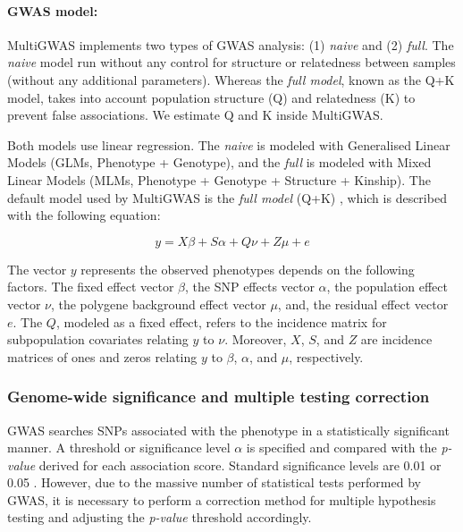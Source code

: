 \paragraph{GWAS model:}
MultiGWAS implements two types of GWAS analysis: (1) \textit{naive} and (2) \textit{full}. The \textit{naive} model run without any control for structure or relatedness between samples (without any additional parameters). Whereas the \textit{full model}, known as the Q+K model, takes into account population structure (Q) and relatedness (K) to prevent false associations. We estimate Q and K inside MultiGWAS. 

Both models use linear regression. The \emph{naive} is modeled with Generalised Linear Models (GLMs, Phenotype + Genotype), and the \emph{full} is modeled with Mixed Linear Models (MLMs, Phenotype + Genotype + Structure + Kinship). The default model used by MultiGWAS is the \emph{full model} (Q+K) \cite{Yu2006}, which is described with the following equation:

\[
y=X\beta+S\alpha+Q\nu+Z\mu+e
\]

The vector $y$ represents the observed phenotypes depends on the following factors. The fixed effect vector $\beta$,  the SNP effects vector $\alpha$, the population effect vector $\nu$, the polygene background effect vector $\mu$, and, the residual effect vector $e$. The $Q$, modeled as a fixed effect, refers to the incidence matrix for subpopulation covariates relating $y$ to $\nu$. Moreover, $X$, $S$, and $Z$ are incidence matrices of ones and zeros relating $y$ to $\beta$, $\alpha$, and $\mu$, respectively.


\subsubsection{Genome-wide significance and multiple testing correction}
GWAS searches SNPs associated with the phenotype in a statistically significant manner. A threshold or significance level $\alpha$ is specified and compared with the \emph{p-value} derived for each association score. Standard significance levels are 0.01 or 0.05 \cite{Gumpinger2018,Rosyara2016}. However, due to the massive number of statistical tests performed by GWAS, it is necessary to perform a correction method for multiple hypothesis testing and adjusting the \emph{p-value} threshold accordingly. 


